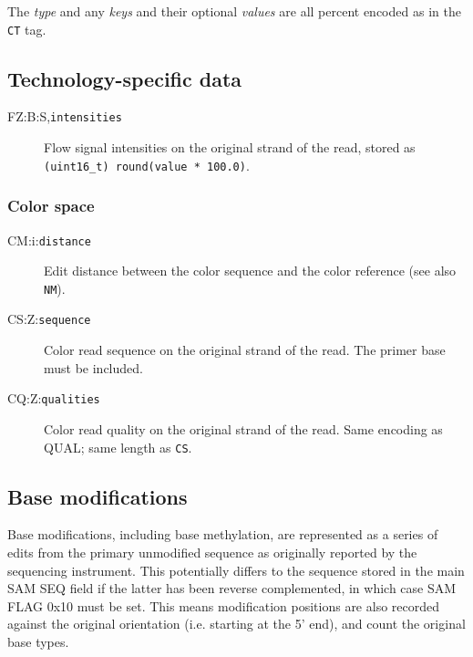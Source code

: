 \documentclass[10pt]{article}
\newcommand{\tagvalue}[1]{{\tt #1}}
\begin{document}
\begin{description}
The \emph{type} and any \emph{keys} and their optional \emph{values}
are all percent encoded as in the {\tt CT} tag.
\end{description}

\subsection{Technology-specific data}

\begin{description}
\item[FZ:B:S,\tagvalue{intensities}]
Flow signal intensities on the original strand of the read, stored as {\tt (uint16\_t) round(value * 100.0)}.
\end{description}

\subsubsection{Color space}


\begin{description}
\item[CM:i:\tagvalue{distance}]
Edit distance between the color sequence and the color reference (see also {\tt NM}).

\item[CS:Z:\tagvalue{sequence}]
Color read sequence on the original strand of the read. The primer base must be included.

\item[CQ:Z:\tagvalue{qualities}]
Color read quality on the original strand of the read. Same encoding as {\sf QUAL}; same length as {\tt CS}.
\end{description}

\subsection{Base modifications}

Base modifications, including base methylation, are represented as a series of edits from the primary unmodified sequence as originally reported by the sequencing instrument.
This potentially differs to the sequence stored in the main SAM {\sf SEQ} field if the latter has been reverse complemented, in which case SAM {\sf FLAG} 0x10 must be set.
This means modification positions are also recorded against the original orientation (i.e. starting at the 5' end), and count the original base types.
\end{document}
